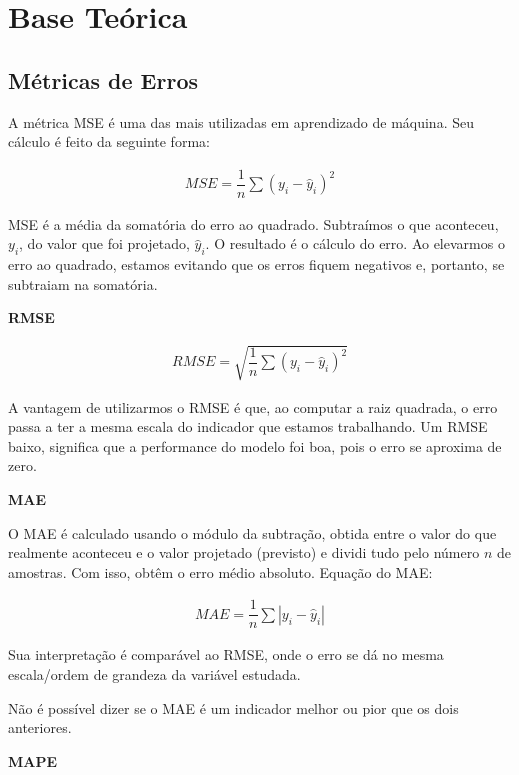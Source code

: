 \section{Base Teórica}\label{sec:base}

\subsection{Métricas de Erros}\label{subsec:metrica}

A métrica MSE é uma das mais utilizadas em aprendizado de máquina. Seu cálculo é feito da seguinte forma:

\begin{eqnarray}
	M S E=\dfrac{1}{n} \sum\left(y_i-\hat{y}_i\right)^2\label{eq:mse}
\end{eqnarray}

MSE é a média da somatória do erro ao quadrado. Subtraímos o que aconteceu, $y_i$, do valor que foi projetado, $\hat{y}_i$. O resultado é o cálculo do erro. Ao elevarmos o erro ao quadrado, estamos evitando que os erros fiquem negativos e, portanto, se subtraiam na somatória.

\textbf{RMSE}

\begin{eqnarray}
	R M S E=\sqrt{\dfrac{1}{n} \sum\left(y_i-\hat{y}_i\right)^2}\label{eq:rmse}
\end{eqnarray}

A vantagem de utilizarmos o RMSE é que, ao computar a raiz quadrada, o erro passa a ter a mesma escala do indicador que estamos trabalhando. Um RMSE baixo, significa que a performance do modelo foi boa, pois o erro se aproxima de zero.

\textbf{MAE}

O MAE é calculado usando o módulo da subtração, obtida entre o valor do que realmente aconteceu e o valor projetado (previsto) e dividi tudo pelo número $n$ de amostras. Com isso, obtêm o erro médio absoluto. Equação do MAE:

\begin{eqnarray}
	M A E=\dfrac{1}{n} \sum\left|y_i-\hat{y}_i\right|\label{eq:mae}
\end{eqnarray}

Sua interpretação é comparável ao RMSE, onde o erro se dá no mesma escala/ordem de grandeza da variável estudada.

Não é possível dizer se o MAE é um indicador melhor ou pior que os dois anteriores.

\textbf{MAPE}

